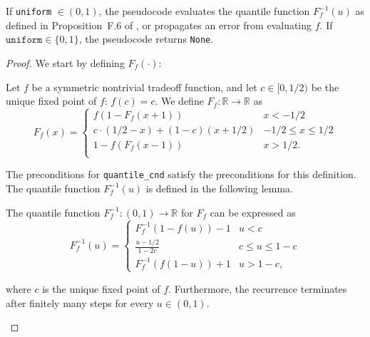 \documentclass{article}
\begin{document}
\begin{theorem}
    \label{postcondition}
    If \texttt{uniform} $\in (0,1)$, the pseudocode evaluates the quantile function $F^{-1}_f(u)$
    as defined in Proposition~F.6 of \cite{awan2023canonical}, or propagates an error from evaluating $f$.
    If $\texttt{uniform} \in \{0,1\}$, the pseudocode returns \texttt{None}.
\end{theorem}

\begin{proof}

We start by defining $F_f(\cdot)$:
\begin{definition}
    \label{def1}  %
    Let $f$ be a symmetric nontrivial tradeoff function, and let {$c\in [0,1/2)$} be the unique fixed point of $f$: $f(c)=c$.
    We define $F_f:\mathbb{R}\rightarrow \mathbb{R}$ as
    \begin{equation}
        F_f(x) = \begin{cases}
            f(1-F_f(x+1))&x<-1/2\\
            c \cdot (1/2-x) + (1-c)(x+1/2)&-1/2\leq x\leq 1/2\\
            1-f(F_f(x-1))&x>1/2.\\
        \end{cases}
    \end{equation}
\end{definition}

The preconditions for \texttt{quantile\_cnd} satisfy the preconditions for this definition.
The quantile function $F^{-1}_f(u)$ is defined in the following lemma.
\begin{proposition}
    \label{prop-f-6}
    The quantile function $F_f^{-1}:(0,1)\rightarrow \mathbb{R}$ for $F_f$ can be expressed as
    \begin{equation}
        F_f^{-1}(u) = \begin{cases}
            F_f^{-1}(1-f(u))-1&u<c\\
            \frac{u-1/2}{1-2c}&c\leq u\leq 1-c\\
            F_f^{-1}(f(1-u))+1&u>1-c,
        \end{cases}
    \end{equation}

    where $c$ is the unique fixed point of $f$.
    Furthermore, the recurrence terminates after finitely many steps for
    every $u\in(0,1)$.
\end{proposition}


\end{proof}
\end{document}
